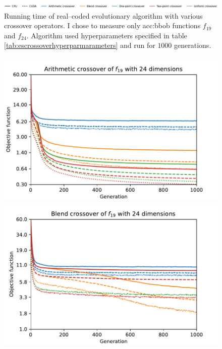 \begin{figure}[ht!]
    \begin{minipage}{\textwidth}
        \centering
        \includegraphics[width=\textwidth]{img/runs/time_es_crossover_legend.pdf}
    \end{minipage}

    \caption[Running time of crossover operators]{Running time of real--coded evolutionary algorithm with various crossover operators. I chose to measure only \acrshort{acc:bbob} functions $f_{19}$ and $f_{24}$. Algorithm used hyperparameters specified in table \ref{tab:escrossoverhyperparmarameters} and run for $1000$ generations.}
\end{figure}


\begin{figure}[ht!]
    \begin{minipage}[t]{0.32\textwidth}
        \centering
        \includegraphics[width=\textwidth]{img/runs/fitness_es_crossover_f19_dim24_Arithmetic.pdf}
    \end{minipage}
    \hfill
    \begin{minipage}[t]{0.32\textwidth}
        \centering
        \includegraphics[width=\textwidth]{img/runs/fitness_es_crossover_f19_dim24_Blend.pdf}

\end{minipage}
\end{figure}
